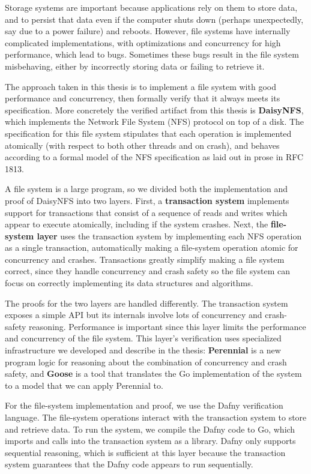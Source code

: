 Storage systems are important because applications rely on them to store
data, and to persist that data even if the computer shuts down (perhaps
unexpectedly, say due to a power failure) and reboots. However, file
systems have internally complicated implementations, with optimizations
and concurrency for high performance, which lead to bugs. Sometimes
these bugs result in the file system misbehaving, either by incorrectly
storing data or failing to retrieve it.

The approach taken in this thesis is to implement a file system with
good performance and concurrency, then formally verify that it always
meets its specification. More concretely the verified artifact from this
thesis is \textbf{DaisyNFS}, which implements the Network File System
(NFS) protocol on top of a disk. The specification for this file system
stipulates that each operation is implemented atomically (with respect
to both other threads and on crash), and behaves according to a formal
model of the NFS specification as laid out in prose in RFC 1813.

A file system is a large program, so we divided both the implementation
and proof of DaisyNFS into two layers. First, a \textbf{transaction
system} implements support for transactions that consist of a sequence
of reads and writes which appear to execute atomically, including if the
system crashes. Next, the \textbf{file-system layer} uses the
transaction system by implementing each NFS operation as a single
transaction, automatically making a file-system operation atomic for
concurrency and crashes. Transactions greatly simplify making a file
system correct, since they handle concurrency and crash safety so the
file system can focus on correctly implementing its data structures and
algorithms.

The proofs for the two layers are handled differently. The transaction
system exposes a simple API but its internals involve lots of
concurrency and crash-safety reasoning. Performance is important since
this layer limits the performance and concurrency of the file system.
This layer's verification uses specialized infrastructure we developed
and describe in the thesis: \textbf{Perennial} is a new program logic
for reasoning about the combination of concurrency and crash safety, and
\textbf{Goose} is a tool that translates the Go implementation of the
system to a model that we can apply Perennial to.

For the file-system implementation and proof, we use the Dafny
verification language. The file-system operations interact with the
transaction system to store and retrieve data. To run the system, we
compile the Dafny code to Go, which imports and calls into the
transaction system as a library. Dafny only supports sequential
reasoning, which is sufficient at this layer because the transaction
system guarantees that the Dafny code appears to run sequentially.

